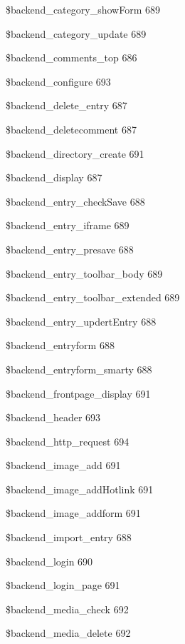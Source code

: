 \documentclass{book}
\renewcommand\subsubitem{\par\hspace*{3mm}}
\begin{document}
\begin{multicols}{2}
\begin{osp-index}
      \subsubitem \$backend\_category\_showForm\hspace{1mm} 689
      \subsubitem \$backend\_category\_update\hspace{1mm} 689
      \subsubitem \$backend\_comments\_top\hspace{1mm} 686
      \subsubitem \$backend\_configure\hspace{1mm} 693
      \subsubitem \$backend\_delete\_entry\hspace{1mm} 687
      \subsubitem \$backend\_deletecomment\hspace{1mm} 687
      \subsubitem \$backend\_directory\_create\hspace{1mm} 691
      \subsubitem \$backend\_display\hspace{1mm} 687
      \subsubitem \$backend\_entry\_checkSave\hspace{1mm} 688
      \subsubitem \$backend\_entry\_iframe\hspace{1mm} 689
      \subsubitem \$backend\_entry\_presave\hspace{1mm} 688
      \subsubitem \$backend\_entry\_toolbar\_body\hspace{1mm} 689
      \subsubitem \$backend\_entry\_toolbar\_extended\hspace{1mm} 689
      \subsubitem \$backend\_entry\_updertEntry\hspace{1mm} 688
      \subsubitem \$backend\_entryform\hspace{1mm} 688
      \subsubitem \$backend\_entryform\_smarty\hspace{1mm} 688
      \subsubitem \$backend\_frontpage\_display\hspace{1mm} 691
      \subsubitem \$backend\_header\hspace{1mm} 693
      \subsubitem \$backend\_http\_request\hspace{1mm} 694
      \subsubitem \$backend\_image\_add\hspace{1mm} 691
      \subsubitem \$backend\_image\_addHotlink\hspace{1mm} 691
      \subsubitem \$backend\_image\_addform\hspace{1mm} 691
      \subsubitem \$backend\_import\_entry\hspace{1mm} 688
      \subsubitem \$backend\_login\hspace{1mm} 690
      \subsubitem \$backend\_login\_page\hspace{1mm} 691
      \subsubitem \$backend\_media\_check\hspace{1mm} 692
      \subsubitem \$backend\_media\_delete\hspace{1mm} 692

\end{osp-index}
\end{multicols}
\end{document}

